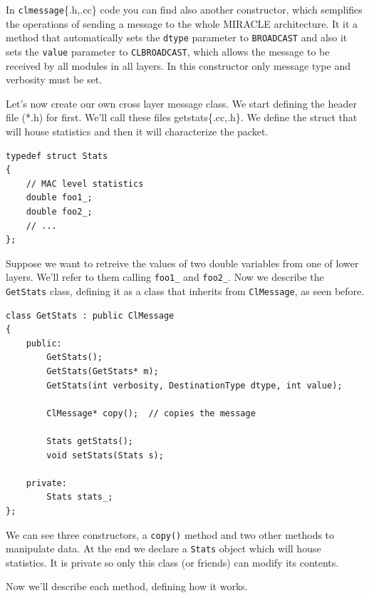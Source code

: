 \documentclass[a4paper,10pt]{article}
\begin{document}
In \verb=clmessage=\{.h,.cc\} code you can find also another constructor, which semplifies the operations of sending a message to the whole MIRACLE architecture. It it a method that automatically sets the \verb=dtype= parameter to \verb=BROADCAST= and also it sets the \verb=value= parameter to \verb=CLBROADCAST=, which allows the message to be received by all modules in all layers. In this constructor only message type and verbosity must be set.

Let's now create our own cross layer message class. We start defining the header file (*.h) for first. We'll call these files getstats\{.cc,.h\}. We define the struct that will house statistics and then it will characterize the packet.

\begin{verbatim}
typedef struct Stats
{
	// MAC level statistics
	double foo1_;
	double foo2_;
	// ...
};
\end{verbatim}

Suppose we want to retreive the values of two double variables from one of lower layers. We'll refer to them calling \verb=foo1_= and \verb=foo2_=.
Now we describe the \verb=GetStats= class, defining it as a class that inherits from \verb=ClMessage=, as seen before.

\begin{verbatim}
class GetStats : public ClMessage
{
	public:
		GetStats();
		GetStats(GetStats* m);
		GetStats(int verbosity, DestinationType dtype, int value);
		
		ClMessage* copy();	// copies the message
	
		Stats getStats();
		void setStats(Stats s);
	
	private:
		Stats stats_;
};

\end{verbatim}

We can see three constructors, a \verb=copy()= method and two other methods to manipulate data. At the end we declare a \verb=Stats= object which will house statistics. It is private so only this class (or friends) can modify its contents.

Now we'll describe each method, defining how it works.
\end{document}
